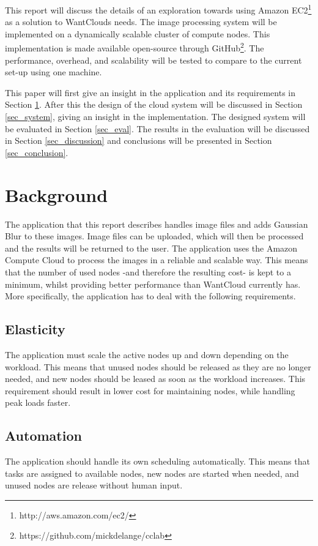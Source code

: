 \documentclass{acm_proc_article-sp}
\begin{document}
This report will discuss the details of an exploration towards using Amazon EC2\footnote{http://aws.amazon.com/ec2/} as a solution to WantClouds needs.
The image processing system will be implemented on a dynamically scalable cluster of compute nodes.
This implementation is made available open-source through GitHub\footnote{https://github.com/mickdelange/cclab}.
The performance, overhead, and scalability will be tested to compare to the current set-up using one machine.

This paper will first give an insight in the application and its requirements in Section \ref{sec_bg}.
After this the design of the cloud system will be discussed in Section \ref{sec_system}, giving an insight in the implementation.
The designed system will be evaluated in Section \ref{sec_eval}.
The results in the evaluation will be discussed in Section \ref{sec_discussion} and conclusions will be presented in Section \ref{sec_conclusion}.

\section{Background}
\label{sec_bg}
The application that this report describes handles image files and adds Gaussian Blur to these images.
Image files can be uploaded, which will then be processed and the results will be returned to the user.
The application uses the Amazon Compute Cloud to process the images in a reliable and scalable way.
This means that the number of used nodes -and therefore the resulting cost- is kept to a minimum, whilst providing better performance than WantCloud currently has.
More specifically, the application has to deal with the following requirements.

\subsection{Elasticity}
The application must scale the active nodes up and down depending on the workload.
This means that unused nodes should be released as they are no longer needed, and new nodes should be leased as soon as the workload increases.
This requirement should result in lower cost for maintaining nodes, while handling peak loads faster.

\subsection{Automation}
The application should handle its own scheduling automatically.
This means that tasks are assigned to available nodes, new nodes are started when needed, and unused nodes are release without human input.
\end{document}
